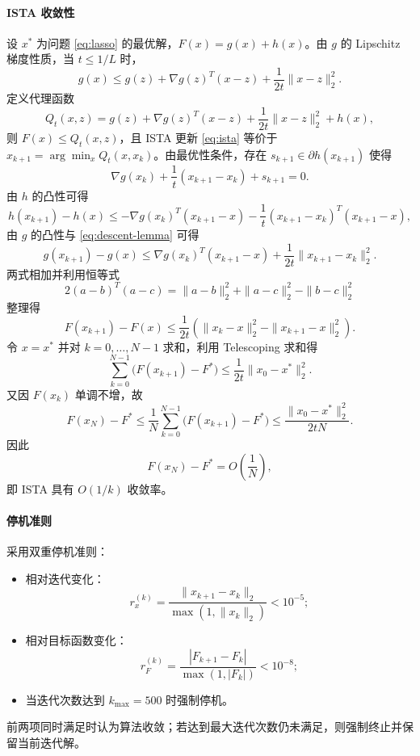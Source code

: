 \documentclass[UTF8]{ctexart}
\numberwithin{figure}{section}
\theoremstyle{definition}
\theoremstyle{examplestyle}
\theoremstyle{remark}
\begin{document}
\paragraph*{ISTA 收敛性}
设 $x^*$ 为问题 \eqref{eq:lasso} 的最优解，$F(x)=g(x)+h(x)$。由 $g$ 的 Lipschitz 梯度性质，当 $t\le1/L$ 时，
\begin{equation}
\label{eq:descent-lemma}
g(x)\le g(z)+\nabla g(z)^T(x-z)+\frac{1}{2t}\|x-z\|_2^2.
\end{equation}
定义代理函数
\begin{equation}
\label{eq:Q}
Q_t(x,z)=g(z)+\nabla g(z)^T(x-z)+\frac{1}{2t}\|x-z\|_2^2+h(x),
\end{equation}
则 $F(x)\le Q_t(x,z)$，且 ISTA 更新 \eqref{eq:ista} 等价于 $x_{k+1}=\arg\min_x Q_t(x,x_k)$。由最优性条件，存在 $s_{k+1}\in\partial h(x_{k+1})$ 使得
\[
\nabla g(x_k)+\frac{1}{t}(x_{k+1}-x_k)+s_{k+1}=0.
\]
由 $h$ 的凸性可得
\[
h(x_{k+1})-h(x)\le-\nabla g(x_k)^T(x_{k+1}-x)-\frac{1}{t}(x_{k+1}-x_k)^T(x_{k+1}-x),
\]
由 $g$ 的凸性与 \eqref{eq:descent-lemma} 可得
\[
g(x_{k+1})-g(x)\le\nabla g(x_k)^T(x_{k+1}-x)+\frac{1}{2t}\|x_{k+1}-x_k\|_2^2.
\]
两式相加并利用恒等式
\[
2(a-b)^T(a-c)=\|a-b\|_2^2+\|a-c\|_2^2-\|b-c\|_2^2
\]
整理得
\begin{equation}
\label{eq:ista-key}
F(x_{k+1})-F(x)\le\frac{1}{2t}\left(\|x_k-x\|_2^2-\|x_{k+1}-x\|_2^2\right).
\end{equation}
令 $x=x^*$ 并对 $k=0,\dots,N-1$ 求和，利用 Telescoping 求和得
\[
\sum_{k=0}^{N-1}\bigl(F(x_{k+1})-F^*\bigr)\le\frac{1}{2t}\|x_0-x^*\|_2^2.
\]
又因 $F(x_k)$ 单调不增，故
\[
F(x_N)-F^*\le\frac{1}{N}\sum_{k=0}^{N-1}\bigl(F(x_{k+1})-F^*\bigr)\le\frac{\|x_0-x^*\|_2^2}{2tN}.
\]
因此
\begin{equation}
\label{eq:ista-rate}
F(x_N)-F^*=O\left(\frac{1}{N}\right),
\end{equation}
即 ISTA 具有 $O(1/k)$ 收敛率。

\paragraph*{停机准则}
采用双重停机准则：
\begin{itemize}
\item 相对迭代变化：
\[
r_x^{(k)}=\frac{\|x_{k+1}-x_k\|_2}{\max(1,\|x_k\|_2)}<10^{-5};
\]
\item 相对目标函数变化：
\[
r_F^{(k)}=\frac{|F_{k+1}-F_k|}{\max(1,|F_k|)}<10^{-8};
\]
\item 当迭代次数达到 $k_{\max}=500$ 时强制停机。
\end{itemize}
前两项同时满足时认为算法收敛；若达到最大迭代次数仍未满足，则强制终止并保留当前迭代解。
\end{document}
